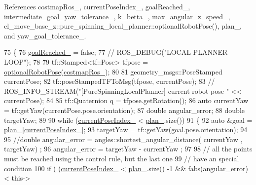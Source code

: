 References costmap\+Ros\+\_\+, current\+Pose\+Index\+\_\+, goal\+Reached\+\_\+, intermediate\+\_\+goal\+\_\+yaw\+\_\+tolerance\+\_\+, k\+\_\+betta\+\_\+, max\+\_\+angular\+\_\+z\+\_\+speed\+\_\+, cl\+\_\+move\+\_\+base\+\_\+z\+::pure\+\_\+spinning\+\_\+local\+\_\+planner\+::optional\+Robot\+Pose(), plan\+\_\+, and yaw\+\_\+goal\+\_\+tolerance\+\_\+.


\begin{DoxyCode}
75 \{
76   \hyperlink{classcl__move__base__z_1_1pure__spinning__local__planner_1_1PureSpinningLocalPlanner_aecfe0dfc68b8c8e461e8b684e5fa4d2f}{goalReached\_} = \textcolor{keyword}{false};
77   \textcolor{comment}{// ROS\_DEBUG("LOCAL PLANNER LOOP");}
78 
79   tf::Stamped<tf::Pose> tfpose = \hyperlink{namespacecl__move__base__z_1_1pure__spinning__local__planner_a6ae763fceb009e0c477171fefe74b4fc}{optionalRobotPose}(\hyperlink{classcl__move__base__z_1_1pure__spinning__local__planner_1_1PureSpinningLocalPlanner_a63f75481071df118d56e8b652e68b002}{costmapRos\_});
80 
81   geometry\_msgs::PoseStamped currentPose;
82   tf::poseStampedTFToMsg(tfpose, currentPose);
83   \textcolor{comment}{// ROS\_INFO\_STREAM("[PureSpinningLocalPlanner] current robot pose " << currentPose);}
84 
85   tf::Quaternion q = tfpose.getRotation();
86   \textcolor{keyword}{auto} currentYaw = tf::getYaw(currentPose.pose.orientation);
87   \textcolor{keywordtype}{double} angular\_error;
88   \textcolor{keywordtype}{double} targetYaw;
89 
90   \textcolor{keywordflow}{while} (\hyperlink{classcl__move__base__z_1_1pure__spinning__local__planner_1_1PureSpinningLocalPlanner_aa0f9b4cf52a76e44dc2cfc5103d52dcd}{currentPoseIndex\_} < \hyperlink{classcl__move__base__z_1_1pure__spinning__local__planner_1_1PureSpinningLocalPlanner_a31875ee78bae4698b579e20c0754860d}{plan\_}.size())
91   \{
92     \textcolor{keyword}{auto} &goal = \hyperlink{classcl__move__base__z_1_1pure__spinning__local__planner_1_1PureSpinningLocalPlanner_a31875ee78bae4698b579e20c0754860d}{plan\_}[\hyperlink{classcl__move__base__z_1_1pure__spinning__local__planner_1_1PureSpinningLocalPlanner_aa0f9b4cf52a76e44dc2cfc5103d52dcd}{currentPoseIndex\_}];
93     targetYaw = tf::getYaw(goal.pose.orientation);
94 
95     \textcolor{comment}{//double angular\_error = angles::shortest\_angular\_distance( currentYaw , targetYaw) ; }
96     angular\_error = targetYaw - currentYaw ;
97 
98     \textcolor{comment}{// all the points must be reached using the control rule, but the last one}
99     \textcolor{comment}{// have an special condition}
100     \textcolor{keywordflow}{if} ( (\hyperlink{classcl__move__base__z_1_1pure__spinning__local__planner_1_1PureSpinningLocalPlanner_aa0f9b4cf52a76e44dc2cfc5103d52dcd}{currentPoseIndex\_} < \hyperlink{classcl__move__base__z_1_1pure__spinning__local__planner_1_1PureSpinningLocalPlanner_a31875ee78bae4698b579e20c0754860d}{plan\_}.size() -1 && fabs(angular\_error) < this->

\end{DoxyCode}

